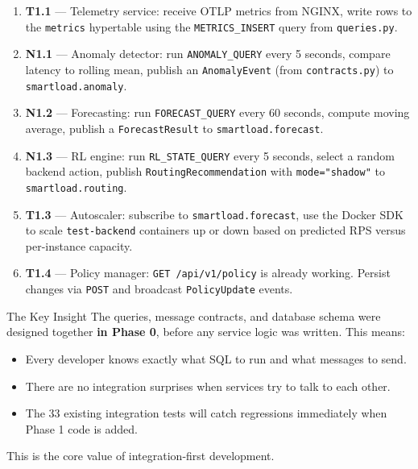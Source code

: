 \documentclass[12pt, a4paper]{article}
\begin{document}
\begin{enumerate}
  \item \textbf{T1.1} --- Telemetry service: receive OTLP metrics from NGINX,
        write rows to the \texttt{metrics} hypertable using the
        \texttt{METRICS\_INSERT} query from \texttt{queries.py}.

  \item \textbf{N1.1} --- Anomaly detector: run \texttt{ANOMALY\_QUERY} every
        5 seconds, compare latency to rolling mean, publish an
        \texttt{AnomalyEvent} (from \texttt{contracts.py}) to
        \texttt{smartload.anomaly}.

  \item \textbf{N1.2} --- Forecasting: run \texttt{FORECAST\_QUERY} every 60
        seconds, compute moving average, publish a \texttt{ForecastResult}
        to \texttt{smartload.forecast}.

  \item \textbf{N1.3} --- RL engine: run \texttt{RL\_STATE\_QUERY} every 5
        seconds, select a random backend action, publish
        \texttt{RoutingRecommendation} with \texttt{mode="shadow"} to
        \texttt{smartload.routing}.

  \item \textbf{T1.3} --- Autoscaler: subscribe to \texttt{smartload.forecast},
        use the Docker SDK to scale \texttt{test-backend} containers up or down
        based on predicted RPS versus per-instance capacity.

  \item \textbf{T1.4} --- Policy manager: \texttt{GET /api/v1/policy} is
        already working. Persist changes via \texttt{POST} and broadcast
        \texttt{PolicyUpdate} events.
\end{enumerate}

\begin{importantbox}{The Key Insight}
The queries, message contracts, and database schema were designed together
\textbf{in Phase 0}, before any service logic was written. This means:
\begin{itemize}
  \item Every developer knows exactly what SQL to run and what messages to send.
  \item There are no integration surprises when services try to talk to each other.
  \item The 33 existing integration tests will catch regressions immediately when
        Phase 1 code is added.
\end{itemize}
This is the core value of integration-first development.
\end{importantbox}
\end{document}
